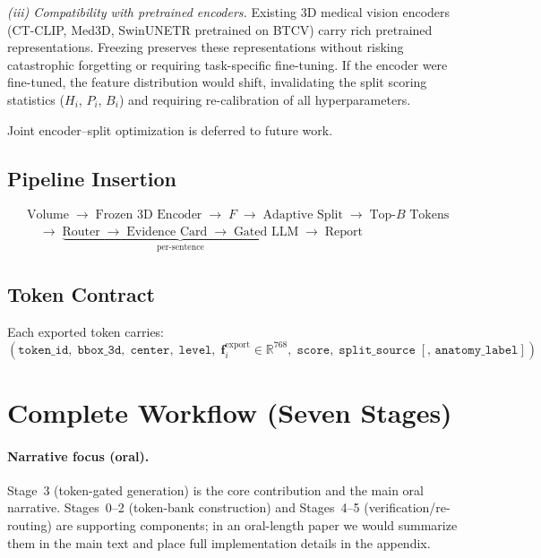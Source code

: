\documentclass[11pt,a4paper]{article}
\newcommand{\RR}{\mathbb{R}}
\begin{document}
\emph{(iii) Compatibility with pretrained encoders.}
Existing 3D medical vision encoders (CT-CLIP, Med3D, SwinUNETR pretrained on BTCV) carry rich pretrained representations. Freezing preserves these representations without risking catastrophic forgetting or requiring task-specific fine-tuning. If the encoder were fine-tuned, the feature distribution would shift, invalidating the split scoring statistics ($H_i$, $P_i$, $B_i$) and requiring re-calibration of all hyperparameters.

Joint encoder--split optimization is deferred to future work.

\subsection{Pipeline Insertion}
\begin{align*}
&\text{Volume} \;\to\; \text{Frozen 3D Encoder} \;\to\; F \;\to\; \text{Adaptive Split} \;\to\; \text{Top-}B\text{ Tokens}\\
&\quad\to\; \underbrace{\text{Router} \;\to\; \text{Evidence Card} \;\to\; \text{Gated LLM}}_{\text{per-sentence}} \;\to\; \text{Report}
\end{align*}

\subsection{Token Contract}
Each exported token carries:
\[
(\texttt{token\_id},\; \texttt{bbox\_3d},\; \texttt{center},\; \texttt{level},\; \mathbf{f}_i^{\mathrm{export}} \in \RR^{768},\; \texttt{score},\; \texttt{split\_source}\; [\texttt{, anatomy\_label}])
\]

\section{Complete Workflow (Seven Stages)}
\label{sec:workflow}

\paragraph{Narrative focus (oral).}
Stage~3 (token-gated generation) is the core contribution and the main oral narrative.
Stages~0--2 (token-bank construction) and Stages~4--5 (verification/re-routing) are supporting components; in an oral-length paper we would summarize them in the main text and place full implementation details in the appendix.
\end{document}
